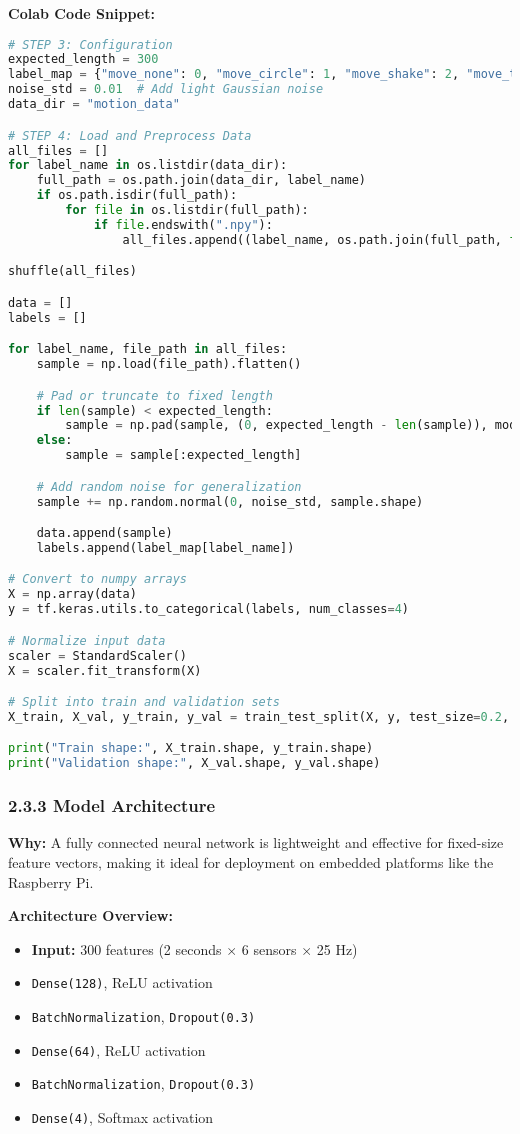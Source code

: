 \documentclass[a4paper,12pt]{article}
\begin{document}
\textbf{Colab Code Snippet:}
\begin{lstlisting}[language=Python]
# STEP 3: Configuration
expected_length = 300
label_map = {"move_none": 0, "move_circle": 1, "move_shake": 2, "move_twist": 3}
noise_std = 0.01  # Add light Gaussian noise
data_dir = "motion_data"

# STEP 4: Load and Preprocess Data
all_files = []
for label_name in os.listdir(data_dir):
    full_path = os.path.join(data_dir, label_name)
    if os.path.isdir(full_path):
        for file in os.listdir(full_path):
            if file.endswith(".npy"):
                all_files.append((label_name, os.path.join(full_path, file)))

shuffle(all_files)

data = []
labels = []

for label_name, file_path in all_files:
    sample = np.load(file_path).flatten()

    # Pad or truncate to fixed length
    if len(sample) < expected_length:
        sample = np.pad(sample, (0, expected_length - len(sample)), mode='constant')
    else:
        sample = sample[:expected_length]

    # Add random noise for generalization
    sample += np.random.normal(0, noise_std, sample.shape)

    data.append(sample)
    labels.append(label_map[label_name])

# Convert to numpy arrays
X = np.array(data)
y = tf.keras.utils.to_categorical(labels, num_classes=4)

# Normalize input data
scaler = StandardScaler()
X = scaler.fit_transform(X)

# Split into train and validation sets
X_train, X_val, y_train, y_val = train_test_split(X, y, test_size=0.2, random_state=42)

print("Train shape:", X_train.shape, y_train.shape)
print("Validation shape:", X_val.shape, y_val.shape)
\end{lstlisting}

\subsubsection*{2.3.3 Model Architecture}

\textbf{Why:} A fully connected neural network is lightweight and effective for fixed-size feature vectors, making it ideal for deployment on embedded platforms like the Raspberry Pi.

\textbf{Architecture Overview:}
\begin{itemize}
    \item \textbf{Input:} 300 features (2 seconds $\times$ 6 sensors $\times$ 25 Hz)
    \item \texttt{Dense(128)}, ReLU activation
    \item \texttt{BatchNormalization}, \texttt{Dropout(0.3)}
    \item \texttt{Dense(64)}, ReLU activation
    \item \texttt{BatchNormalization}, \texttt{Dropout(0.3)}
    \item \texttt{Dense(4)}, Softmax activation
\end{itemize}
\end{document}
